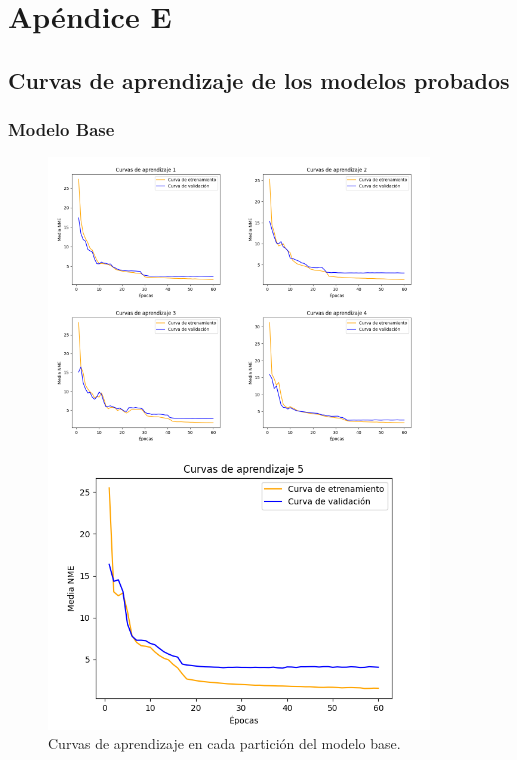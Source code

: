 
\chapter{Apéndice E}\label{ap:apendiceD}

\section{Curvas de aprendizaje de los modelos probados}

\subsection*{Modelo Base}
\begin{figure}[H]
    \centering
    \includegraphics[width=0.9\textwidth]{img/curvas_aprendizaje_modelbase.png}
    \caption{Curvas de aprendizaje en cada partición del modelo base.}
    \label{fig:Curvas_modelbase}
\end{figure}

